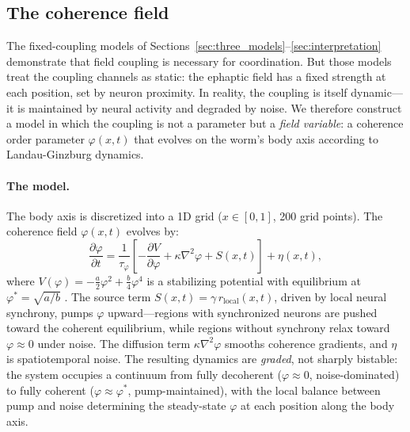 \documentclass[12pt]{article}
\begin{document}
\subsection{The coherence field}
\label{sec:coherence_field}

The fixed-coupling models of Sections~\ref{sec:three_models}--\ref{sec:interpretation} demonstrate that field coupling is necessary for coordination. But those models treat the coupling channels as static: the ephaptic field has a fixed strength at each position, set by neuron proximity. In reality, the coupling is itself dynamic---it is maintained by neural activity and degraded by noise. We therefore construct a model in which the coupling is not a parameter but a \textit{field variable}: a coherence order parameter $\varphi(x, t)$ that evolves on the worm's body axis according to Landau-Ginzburg dynamics.

\paragraph{The model.} The body axis is discretized into a 1D grid ($x \in [0,1]$, 200 grid points). The coherence field $\varphi(x,t)$ evolves by:
\begin{equation}
\label{eq:coherence}
\frac{\partial \varphi}{\partial t} = \frac{1}{\tau_\varphi}\left[-\frac{\partial V}{\partial \varphi} + \kappa \nabla^2 \varphi + S(x,t)\right] + \eta(x,t),
\end{equation}
where $V(\varphi) = -\frac{a}{2}\varphi^2 + \frac{b}{4}\varphi^4$ is a stabilizing potential with equilibrium at $\varphi^* = \sqrt{a/b}$ \cite{hohenberg1977}. The source term $S(x,t) = \gamma \, r_{\mathrm{local}}(x,t)$, driven by local neural synchrony, pumps $\varphi$ upward---regions with synchronized neurons are pushed toward the coherent equilibrium, while regions without synchrony relax toward $\varphi \approx 0$ under noise. The diffusion term $\kappa \nabla^2 \varphi$ smooths coherence gradients, and $\eta$ is spatiotemporal noise. The resulting dynamics are \textit{graded}, not sharply bistable: the system occupies a continuum from fully decoherent ($\varphi \approx 0$, noise-dominated) to fully coherent ($\varphi \approx \varphi^*$, pump-maintained), with the local balance between pump and noise determining the steady-state $\varphi$ at each position along the body axis.
\end{document}
